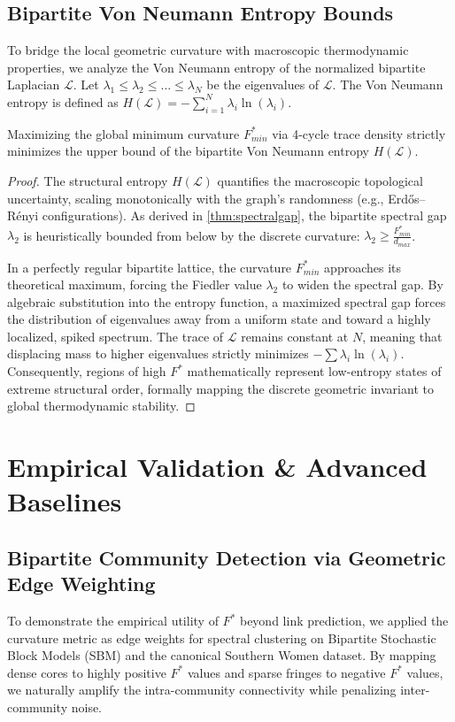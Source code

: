 \documentclass{siuro250211}
\begin{document}
\subsection{Bipartite Von Neumann Entropy Bounds}
To bridge the local geometric curvature with macroscopic thermodynamic properties, we analyze the Von Neumann entropy of the normalized bipartite Laplacian $\mathcal{L}$. Let $\lambda_1 \le \lambda_2 \le \dots \le \lambda_N$ be the eigenvalues of $\mathcal{L}$. The Von Neumann entropy is defined as $H(\mathcal{L}) = - \sum_{i=1}^N \lambda_i \ln(\lambda_i)$.

\begin{theorem}
Maximizing the global minimum curvature $F_{min}^*$ via 4-cycle trace density strictly minimizes the upper bound of the bipartite Von Neumann entropy $H(\mathcal{L})$.
\end{theorem}

\begin{proof}
The structural entropy $H(\mathcal{L})$ quantifies the macroscopic topological uncertainty, scaling monotonically with the graph's randomness (e.g., Erdős–Rényi configurations). As derived in \cref{thm:spectralgap}, the bipartite spectral gap $\lambda_2$ is heuristically bounded from below by the discrete curvature: $\lambda_2 \ge \frac{F_{min}^*}{d_{max}}$. 

In a perfectly regular bipartite lattice, the curvature $F_{min}^*$ approaches its theoretical maximum, forcing the Fiedler value $\lambda_2$ to widen the spectral gap. By algebraic substitution into the entropy function, a maximized spectral gap forces the distribution of eigenvalues away from a uniform state and toward a highly localized, spiked spectrum. The trace of $\mathcal{L}$ remains constant at $N$, meaning that displacing mass to higher eigenvalues strictly minimizes $- \sum \lambda_i \ln(\lambda_i)$. Consequently, regions of high $F^*$ mathematically represent low-entropy states of extreme structural order, formally mapping the discrete geometric invariant to global thermodynamic stability.
\end{proof}

\section{Empirical Validation \& Advanced Baselines}

\subsection{Bipartite Community Detection via Geometric Edge Weighting}
To demonstrate the empirical utility of $F^*$ beyond link prediction, we applied the curvature metric as edge weights for spectral clustering on Bipartite Stochastic Block Models (SBM) and the canonical Southern Women dataset. By mapping dense cores to highly positive $F^*$ values and sparse fringes to negative $F^*$ values, we naturally amplify the intra-community connectivity while penalizing inter-community noise.
\end{document}
